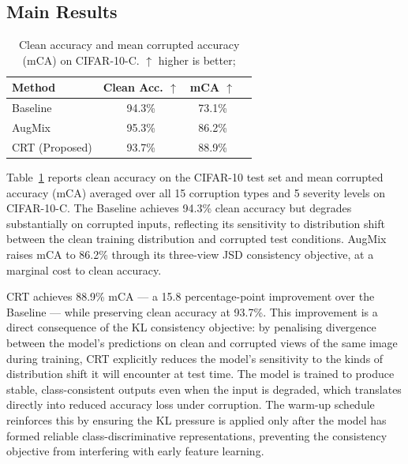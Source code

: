 \documentclass[10pt,twocolumn]{article}
\begin{document}
\subsection{Main Results}

\begin{table}[t]
\centering
\caption{Clean accuracy and mean corrupted accuracy (mCA) on CIFAR-10-C.  $\uparrow$ higher is better; }
\label{tab:main_results}
\begin{tabular}{lccc}
\toprule
\textbf{Method} & \textbf{Clean Acc.} $\uparrow$ & \textbf{mCA} $\uparrow$   \\
\midrule
Baseline        & 94.3\%       & 73.1\% \\
AugMix          & 95.3\%       & 86.2\% \\
CRT (Proposed)  & 93.7\%       & 88.9\% \\
\bottomrule
\end{tabular}
\end{table}

Table~\ref{tab:main_results} reports clean accuracy on the CIFAR-10 test set and mean corrupted accuracy (mCA) averaged over all 15 corruption types and 5 severity levels on CIFAR-10-C. The Baseline achieves 94.3\% clean accuracy but degrades substantially on corrupted inputs, reflecting its sensitivity to distribution shift between the clean training distribution and corrupted test conditions. AugMix raises mCA to 86.2\% through its three-view JSD consistency objective, at a marginal cost to clean accuracy.

CRT achieves 88.9\% mCA --- a 15.8 percentage-point improvement over the Baseline --- while preserving clean accuracy at 93.7\%. This improvement is a direct consequence of the KL consistency objective: by penalising divergence between the model's predictions on clean and corrupted views of the same image during training, CRT explicitly reduces the model's sensitivity to the kinds of distribution shift it will encounter at test time. The model is trained to produce stable, class-consistent outputs even when the input is degraded, which translates directly into reduced accuracy loss under corruption. The warm-up schedule reinforces this by ensuring the KL pressure is applied only after the model has formed reliable class-discriminative representations, preventing the consistency objective from interfering with early feature learning.
\end{document}
